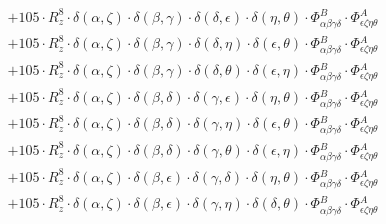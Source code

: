 \documentclass{article}
\begin{document}
\begin{equation}
\begin{array}{c}
 \\[0.2em] 		 + 105 \cdot R_{z}^{8} \cdot \delta{}\left(\alpha{}, \zeta{}\right) \cdot \delta{}\left(\beta{}, \gamma{}\right) \cdot \delta{}\left(\delta{}, \epsilon{}\right) \cdot \delta{}\left(\eta{}, \theta{}\right) \cdot \Phi{}^{B}_{\alpha{}\beta{}\gamma{}\delta{}} \cdot \Phi{}^{A}_{\epsilon{}\zeta{}\eta{}\theta{}} 
 \\[0.2em] 		 + 105 \cdot R_{z}^{8} \cdot \delta{}\left(\alpha{}, \zeta{}\right) \cdot \delta{}\left(\beta{}, \gamma{}\right) \cdot \delta{}\left(\delta{}, \eta{}\right) \cdot \delta{}\left(\epsilon{}, \theta{}\right) \cdot \Phi{}^{B}_{\alpha{}\beta{}\gamma{}\delta{}} \cdot \Phi{}^{A}_{\epsilon{}\zeta{}\eta{}\theta{}} 
 \\[0.2em] 		 + 105 \cdot R_{z}^{8} \cdot \delta{}\left(\alpha{}, \zeta{}\right) \cdot \delta{}\left(\beta{}, \gamma{}\right) \cdot \delta{}\left(\delta{}, \theta{}\right) \cdot \delta{}\left(\epsilon{}, \eta{}\right) \cdot \Phi{}^{B}_{\alpha{}\beta{}\gamma{}\delta{}} \cdot \Phi{}^{A}_{\epsilon{}\zeta{}\eta{}\theta{}} 
 \\[0.2em] 		 + 105 \cdot R_{z}^{8} \cdot \delta{}\left(\alpha{}, \zeta{}\right) \cdot \delta{}\left(\beta{}, \delta{}\right) \cdot \delta{}\left(\gamma{}, \epsilon{}\right) \cdot \delta{}\left(\eta{}, \theta{}\right) \cdot \Phi{}^{B}_{\alpha{}\beta{}\gamma{}\delta{}} \cdot \Phi{}^{A}_{\epsilon{}\zeta{}\eta{}\theta{}} 
 \\[0.2em] 		 + 105 \cdot R_{z}^{8} \cdot \delta{}\left(\alpha{}, \zeta{}\right) \cdot \delta{}\left(\beta{}, \delta{}\right) \cdot \delta{}\left(\gamma{}, \eta{}\right) \cdot \delta{}\left(\epsilon{}, \theta{}\right) \cdot \Phi{}^{B}_{\alpha{}\beta{}\gamma{}\delta{}} \cdot \Phi{}^{A}_{\epsilon{}\zeta{}\eta{}\theta{}} 
 \\[0.2em] 		 + 105 \cdot R_{z}^{8} \cdot \delta{}\left(\alpha{}, \zeta{}\right) \cdot \delta{}\left(\beta{}, \delta{}\right) \cdot \delta{}\left(\gamma{}, \theta{}\right) \cdot \delta{}\left(\epsilon{}, \eta{}\right) \cdot \Phi{}^{B}_{\alpha{}\beta{}\gamma{}\delta{}} \cdot \Phi{}^{A}_{\epsilon{}\zeta{}\eta{}\theta{}} 
 \\[0.2em] 		 + 105 \cdot R_{z}^{8} \cdot \delta{}\left(\alpha{}, \zeta{}\right) \cdot \delta{}\left(\beta{}, \epsilon{}\right) \cdot \delta{}\left(\gamma{}, \delta{}\right) \cdot \delta{}\left(\eta{}, \theta{}\right) \cdot \Phi{}^{B}_{\alpha{}\beta{}\gamma{}\delta{}} \cdot \Phi{}^{A}_{\epsilon{}\zeta{}\eta{}\theta{}} 
 \\[0.2em] 		 + 105 \cdot R_{z}^{8} \cdot \delta{}\left(\alpha{}, \zeta{}\right) \cdot \delta{}\left(\beta{}, \epsilon{}\right) \cdot \delta{}\left(\gamma{}, \eta{}\right) \cdot \delta{}\left(\delta{}, \theta{}\right) \cdot \Phi{}^{B}_{\alpha{}\beta{}\gamma{}\delta{}} \cdot \Phi{}^{A}_{\epsilon{}\zeta{}\eta{}\theta{}} 

\end{array}
\end{equation}
\end{document}
